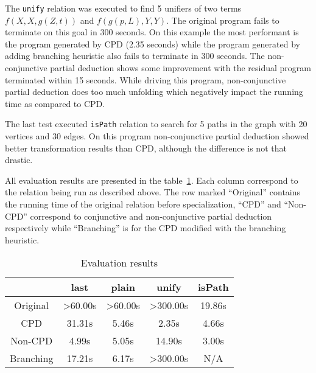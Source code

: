 The \lstinline{unify} relation was executed to find 5 unifiers of two terms $f(X, X, g(Z, t))$ and $f(g(p, L), Y, Y)$.
The original \mk{} program fails to terminate on this goal in 300 seconds.
On this example the most performant is the program generated by CPD (2.35 seconds) while the program generated by adding branching heuristic also fails to terminate in 300 seconds.
The non-conjunctive partial deduction shows some improvement with the residual program terminated within 15 seconds.
While driving this program, non-conjunctive partial deduction does too much unfolding which negatively impact the running time as compared to CPD.

The last test executed \lstinline{isPath} relation to search for 5 paths in the graph with 20 vertices and 30 edges.
On this program non-conjunctive partial deduction showed better transformation results than CPD, although the difference is not that drastic.

All evaluation results are presented in the table~\ref{tbl:eval}.
Each column correspond to the relation being run as described above.
The row marked ``Original'' contains the running time of the original \mk{} relation before specialization, ``CPD'' and ``Non-CPD'' correspond to conjunctive and non-conjunctive partial deduction respectively while ``Branching'' is for the CPD modified with the branching heuristic.

\begin{table}
  \centering
  \begin{tabular}{c|c|c||c||c}
                   & last & plain & unify & isPath \\
  \hline\hline
  Original         & >60.00s & >60.00s & >300.00s & 19.86s \\
  \hline
  CPD              & 31.31s & 5.46s & 2.35s & 4.66s \\
  \hline
  Non-CPD          & 4.99s  & 5.05s & 14.90s & 3.00s \\
  \hline
  Branching        & 17.21s  & 6.17s & >300.00s & N/A \\
  \hline
  \end{tabular}

  \caption{Evaluation results}
  \label{tbl:eval}
\end{table}



